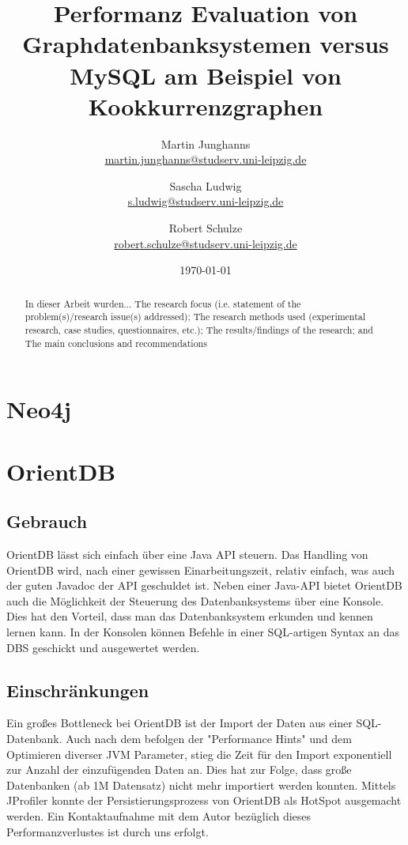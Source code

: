 \documentclass[11pt, a4paper, oneside, twocolumn]{article} %
\author{Martin Junghanns \\  \url{martin.junghanns@studserv.uni-leipzig.de} \and 
		Sascha Ludwig \\ \url{s.ludwig@studserv.uni-leipzig.de} \and 
		Robert Schulze \\ \url{robert.schulze@studserv.uni-leipzig.de} }
\date{\today}
\title{Performanz Evaluation von Graphdatenbanksystemen versus MySQL am Beispiel von Kookkurrenzgraphen }
\begin{document}
\renewcommand{\labelitemi}{-}

\maketitle

\begin{abstract}
	In dieser Arbeit wurden...    The research focus (i.e. statement of the problem(s)/research issue(s) addressed);
    The research methods used (experimental research, case studies, questionnaires, etc.);
    The results/findings of the research; and
    The main conclusions and recommendations

\end{abstract}

\section{Neo4j}

\section{OrientDB}

\subsection{Gebrauch}
OrientDB lässt sich einfach über eine Java API steuern. Das Handling von OrientDB wird, nach einer gewissen Einarbeitungszeit, relativ einfach, was auch der guten Javadoc der API geschuldet ist. Neben einer Java-API bietet OrientDB auch die Möglichkeit der Steuerung des Datenbanksystems über eine Konsole. Dies hat den Vorteil, dass man das Datenbanksystem erkunden und kennen lernen kann. In der Konsolen können Befehle in einer SQL-artigen Syntax an das DBS geschickt und ausgewertet werden.

\subsection{Einschränkungen}
Ein großes Bottleneck bei OrientDB ist der Import der Daten aus einer SQL-Datenbank. Auch nach dem befolgen der "Performance Hints" und dem Optimieren diverser JVM Parameter, stieg die Zeit für den Import exponentiell zur Anzahl der einzufügenden Daten an. Dies hat zur Folge, dass große Datenbanken (ab 1M Datensatz) nicht mehr importiert werden konnten. Mittels JProfiler konnte der Persistierungsprozess von OrientDB als HotSpot ausgemacht werden. Ein Kontaktaufnahme mit dem Autor bezüglich dieses Performanzverlustes ist durch uns erfolgt.
\end{document}
